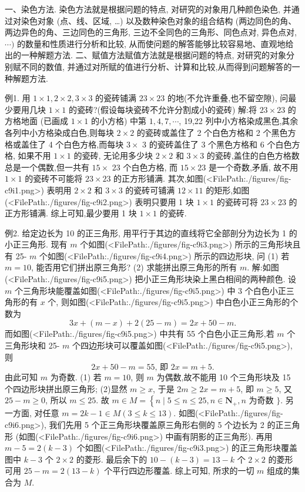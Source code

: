 
一、染色方法.
染色方法就是根据问题的特点, 对研究的对象用几种颜色染色, 并通过对染色对象 (点、线、区域, …) 以及数种染色对象的组合结构 (两边同色的角、 两边异色的角、三边同色的三角形, 三边不全同色的三角形、同色点对, 异色点对, $\cdots)$ 的数量和性质进行分析和比较, 从而使问题的解答能够比较容易地、直观地给出的一种解题方法.
二、赋值方法赋值方法就是根据问题的特点, 对研究的对象分别赋不同的数值, 并通过对所赋的值进行分析、计算和比较,从而得到问题解答的一种解题方法.



例1. 用 $1 \times 1,2 \times 2,3 \times 3$ 的瓷砖铺满 $23 \times 23$ 的地(不允许重叠,也不留空隙), 问最少要用几块 $1 \times 1$ 的瓷砖?(假设每块瓷砖不允许分割成小的瓷砖)
解:将 $23 \times 23$ 的方格地面 (已画成 $1 \times 1$ 的小方格) 中第 $1,4,7, \cdots$, 19,22 列中小方格染成黑色,其余各列中小方格染成白色,则每块 $2 \times 2$ 的瓷砖或盖住了 2 个白色方格和 2 个黑色方格或盖住了 4 个白色方格,而每块 $3 \times$ 3 的瓷砖盖住了 3 个黑色方格和 6 个白色方格, 如果不用 $1 \times 1$ 的瓷砖, 无论用多少块 $2 \times 2$ 和 $3 \times 3$ 的瓷砖,盖住的白色方格数总是一个偶数,但一共有 $15 \times$ 23 个白色方格, 而 $15 \times 23$ 是一个奇数,矛盾, 故不用 $1 \times 1$ 的瓷砖不可能将 $23 \times 23$ 的正方形铺满.
其次,如图(<FilePath:./figures/fig-c9i1.png>) 表明用 $2 \times 2$ 和 $3 \times 3$ 的瓷砖可铺满 $12 \times 11$ 的矩形,如图(<FilePath:./figures/fig-c9i2.png>) 表明只要用 1 块 $1 \times 1$ 的瓷砖可将 $23 \times 23$ 的正方形铺满.
综上可知,最少要用 1 块 $1 \times 1$ 的瓷砖.



例2. 给定边长为 10 的正三角形, 用平行于其边的直线将它全部剖分为边长为 1 的小正三角形.
现有 $m$ 个如图(<FilePath:./figures/fig-c9i3.png>) 所示的三角形块且有 25- $m$ 个如图(<FilePath:./figures/fig-c9i4.png>) 所示的四边形块, 问
(1) 若 $m=10$, 能否用它们拼出原三角形?
(2) 求能拼出原三角形的所有 $m$.
解:如图(<FilePath:./figures/fig-c9i5.png>) 把小正三角形块染上黑白相间的两种颜色.
设 $m$ 个三角形块能覆盖如图(<FilePath:./figures/fig-c9i5.png>) 中 3 个白色小正三角形的有 $x$ 个, 则如图(<FilePath:./figures/fig-c9i5.png>) 中白色小正三角形的个数为
$$
3 x+(m-x)+2(25-m)=2 x+50-m .
$$
而如图(<FilePath:./figures/fig-c9i5.png>) 中共有 55 个白色小正三角形,若 $m$ 个三角形块和 25- $m$ 个四边形块可以覆盖如图(<FilePath:./figures/fig-c9i5.png>), 则
$$
2 x+50-m=55 \text {, 即 } 2 x=m+5 .
$$
由此可知 $m$ 为奇数.
(1) 若 $m=10$, 则 $m$ 为偶数,故不能用 10 个三角形块及 15 个四边形块拼出原三角形;
(2)显然 $m \geqslant x$, 于是 $2 m \geqslant 2 x=m+5$, 即 $m \geqslant 5$, 又 $25-m \geqslant 0$, 所以 $m \leqslant 25$. 故 $m \in M=\left\{n \mid 5 \leqslant n \leqslant 25, n \in \mathbf{N}_{+}, n\right.$ 为奇数 $\}$. 另一方面, 对任意 $m=2 k-1 \in M(3 \leqslant k \leqslant 13)$. 如图(<FilePath:./figures/fig-c9i6.png>), 我们先用 5 个正三角形块覆盖原三角形右侧的 5 个边长为 2 的正三角形 (如图(<FilePath:./figures/fig-c9i6.png>) 中画有阴影的正三角形). 再用 $m-5=2(k-3)$ 个如图(<FilePath:./figures/fig-c9i3.png>) 的正三角形块覆盖图中 $k-3$ 个 $2 \times 2$ 的菱形.
最后余下的 $10-(k-3)=13-k$ 个 $2 \times 2$ 的菱形可用 $25-m=2(13-k)$ 个平行四边形覆盖.
综上可知, 所求的一切 $m$ 组成的集合为 $M$.



